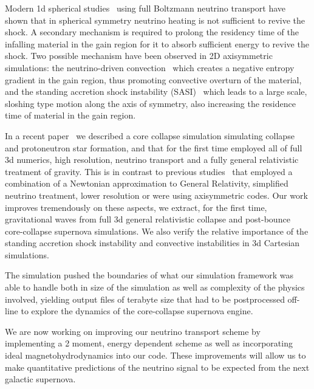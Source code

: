 \documentclass[12pt]{article}
\begin{document}
Modern 1d spherical studies~\cite{2001PhRvD..63j4003L} %
using full Boltzmann neutrino transport have shown that in spherical symmetry
neutrino heating
is not sufficient to revive the shock.
A secondary mechanism is required
to prolong the residency time of the infalling material in the gain region for
it to absorb sufficient energy to revive the shock.
Two possible mechanism have been observed in 2D axisymmetric
simulations: the neutrino-driven convection~\cite{1994ApJ...435..339H} %
which creates a negative entropy gradient in
the gain region, thus promoting convective overturn of the material,
and the standing accretion shock instability
(SASI)~\cite{2003ApJ...584..971B} %
which leads to a large scale, sloshing type motion along the axis
of symmetry, also increasing the residence time of material in the gain
region. 

In a recent paper~\cite{2012arXiv1210.6674O} we described a
core collapse simulation simulating collapse and
protoneutron star formation, and that for the first time employed all of full 3d numerics,
high
resolution, neutrino transport and a fully general relativistic
treatment of gravity. This is in contrast to previous
studies~\cite{Kuroda:2012nc,Nordhaus:2010uk,Mueller:2012ak} that
employed a combination of a Newtonian approximation to General Relativity,
simplified neutrino
treatment, lower resolution or were using axisymmetric codes. Our work improves
tremendously on these aspects, we extract, for the first time, 
gravitational waves from full 3d general relativistic collapse and post-bounce
core-collapse supernova simulations. We also verify the relative importance of
the standing accretion shock instability and convective instabilities in 3d
Cartesian simulations. 

The simulation pushed the boundaries of what our
simulation framework was able to handle both in size of the simulation as
well as complexity of the physics involved, yielding output files of terabyte
size that had to be postprocessed off-line to explore the dynamics of the
core-collapse supernova engine.

We are now working on improving our
neutrino transport scheme by implementing a 2 moment, energy dependent scheme
as well as incorporating ideal magnetohydrodynamics into our code. These
improvements will allow us to make quantitative predictions of the neutrino
signal to be expected from the next galactic supernova. 
\end{document}
